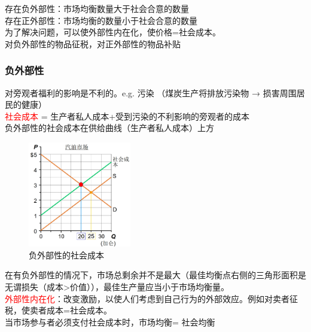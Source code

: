\documentclass[12pt,a4paper]{article}
\begin{document}
\noindent 存在负外部性：市场均衡数量大于社会合意的数量\\
存在正外部性：市场均衡的数量小于社会合意的数量\\

\noindent 为了解决问题，可以使外部性内在化，使价格=社会成本。\\
对负外部性的物品征税，对正外部性的物品补贴\\

\subsubsection{负外部性}
对旁观者福利的影响是不利的。e.g. 污染 （煤炭生产将排放污染物 → 损害周围居民的健康）\\

\textcolor{red}{社会成本} = 生产者私人成本+受到污染的不利影响的旁观者的成本\\

负外部性的社会成本在供给曲线（生产者私人成本）上方
\begin{figure}[H] 
  \centering %
  \includegraphics[width=0.4\textwidth]{负外部性.png} 
  \caption{负外部性的社会成本} %
\end{figure}
在有负外部性的情况下，市场总剩余并不是最大（最佳均衡点右侧的三角形面积是无谓损失（成本>价值）），最佳生产量应当小于市场均衡量。\\

\textcolor{red}{外部性内在化}：改变激励，以使人们考虑到自己行为的外部效应。例如对卖者征税，使卖者成本=社会成本。\\

当市场参与者必须支付社会成本时，市场均衡= 社会均衡

\end{document}
